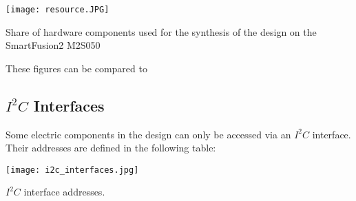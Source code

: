 \begin{table}[H]
	\centering
    \texttt{[image: resource.JPG]}
    \caption[Components]{Share of hardware components used for the synthesis of the design on the SmartFusion2 M2S050}
	\label{tab:resource}
\end{table}

These figures can be compared to 

\subsection{\texorpdfstring{$I^2C$}{TEXT} Interfaces}
\label{sec:i2c_interfaces}
Some electric components in the design can only be accessed via an $I^2C$ interface. 
Their addresses are defined in the following table:
\begin{table}[H]
	\centering
    \texttt{[image: i2c\_interfaces.jpg]}
    \caption[$I^2C$ Interfaces]{$I^2C$ interface addresses.}
	\label{tab:i2c_interfaces}
\end{table}
